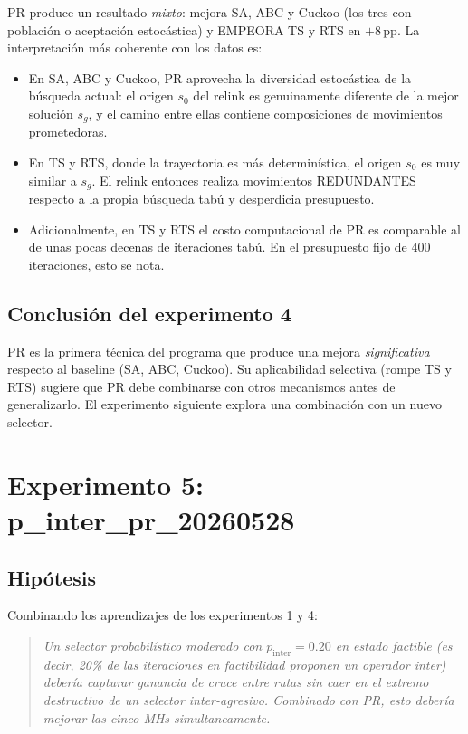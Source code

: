 PR produce un resultado \emph{mixto}: mejora SA, ABC y Cuckoo (los tres
con población o aceptación estocástica) y EMPEORA TS y RTS en
$+8\,$pp. La interpretación más coherente con los datos es:

\begin{itemize}
\item En SA, ABC y Cuckoo, PR aprovecha la diversidad estocástica de la
  búsqueda actual: el origen $s_0$ del relink es genuinamente
  diferente de la mejor solución $s_g$, y el camino entre ellas
  contiene composiciones de movimientos prometedoras.
\item En TS y RTS, donde la trayectoria es más determinística, el
  origen $s_0$ es muy similar a $s_g$. El relink entonces realiza
  movimientos REDUNDANTES respecto a la propia búsqueda tabú y
  desperdicia presupuesto.
\item Adicionalmente, en TS y RTS el costo computacional de PR es
  comparable al de unas pocas decenas de iteraciones tabú. En el
  presupuesto fijo de 400 iteraciones, esto se nota.
\end{itemize}

\subsection{Conclusión del experimento 4}

PR es la primera técnica del programa que produce una mejora
\emph{significativa} respecto al baseline (SA, ABC, Cuckoo). Su
aplicabilidad selectiva (rompe TS y RTS) sugiere que PR debe combinarse
con otros mecanismos antes de generalizarlo. El experimento siguiente
explora una combinación con un nuevo selector.

\section{Experimento 5: p\_inter\_pr\_20260528}
\label{sec:exp-pip}

\subsection{Hipótesis}

Combinando los aprendizajes de los experimentos 1 y 4:

\begin{quote}
\textit{Un selector probabilístico moderado con $p_{\text{inter}} = 0.20$
en estado factible (es decir, 20\% de las iteraciones en factibilidad
proponen un operador inter) debería capturar ganancia de cruce entre
rutas sin caer en el extremo destructivo de un selector inter-agresivo.
Combinado con PR, esto debería mejorar las cinco MHs simultaneamente.}
\end{quote}

